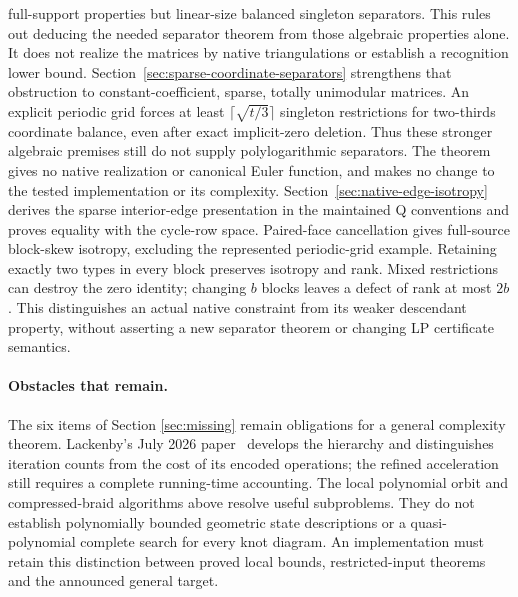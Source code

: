 \documentclass[11pt]{article}
\theoremstyle{remark}
\begin{document}
full-support properties but linear-size balanced singleton separators.
This rules out deducing the needed separator theorem from those algebraic
properties alone.  It does not realize the matrices by native triangulations
or establish a recognition lower bound.
Section~\ref{sec:sparse-coordinate-separators} strengthens that obstruction
to constant-coefficient, sparse, totally unimodular matrices.  An explicit
periodic grid forces at least $\lceil\sqrt{t/3}\rceil$ singleton restrictions
for two-thirds coordinate balance, even after exact implicit-zero deletion.
Thus these stronger algebraic premises still do not supply polylogarithmic
separators.  The theorem gives no native realization or canonical Euler
function, and makes no change to the tested implementation or its complexity.
Section~\ref{sec:native-edge-isotropy} derives the sparse interior-edge
presentation in the maintained Q conventions and proves equality with the
cycle-row space.  Paired-face cancellation gives full-source block-skew
isotropy, excluding the represented periodic-grid example.  Retaining exactly
two types in every block preserves isotropy and rank.  Mixed restrictions
can destroy the zero identity; changing $b$ blocks leaves a defect of rank
at most $2b$.  This distinguishes an actual native
constraint from its weaker descendant property, without asserting a new
separator theorem or changing LP certificate semantics.

\paragraph{Obstacles that remain.}
The six items of Section \ref{sec:missing} remain obligations for a general
complexity theorem. Lackenby's July 2026 paper~\cite{lackenby2026} develops
the hierarchy and distinguishes iteration counts from the cost of its encoded
operations; the refined acceleration still requires a complete running-time
accounting. The local polynomial orbit and compressed-braid algorithms above
resolve useful subproblems. They do not establish polynomially bounded
geometric state descriptions or a quasi-polynomial complete search for every
knot diagram. An implementation must retain this distinction between proved
local bounds, restricted-input theorems and the announced general target.
\end{document}
